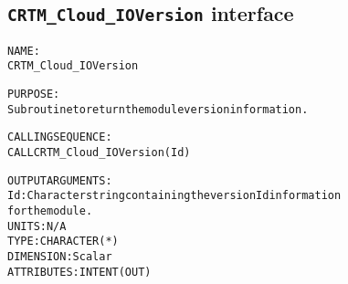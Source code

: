 \subsection{\texttt{CRTM\_Cloud\_IOVersion} interface}
  \label{sec:CRTM_Cloud_IOVersion_interface}
  \begin{alltt}
 
  NAME:
        CRTM_Cloud_IOVersion
 
  PURPOSE:
        Subroutine to return the module version information.
 
  CALLING SEQUENCE:
        CALL CRTM_Cloud_IOVersion( Id )
 
  OUTPUT ARGUMENTS:
        Id:            Character string containing the version Id information
                       for the module.
                       UNITS:      N/A
                       TYPE:       CHARACTER(*)
                       DIMENSION:  Scalar
                       ATTRIBUTES: INTENT(OUT)
 
  \end{alltt}
